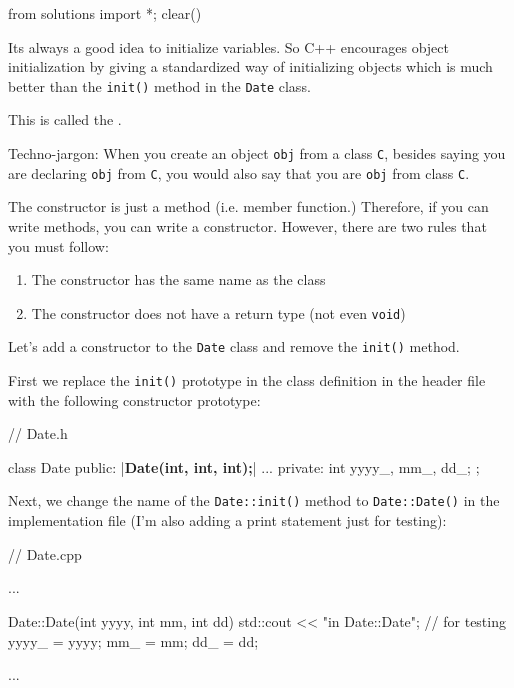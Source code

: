 \begin{python0}
from solutions import *; clear()
\end{python0}

Its always a good idea to initialize variables. So C++ encourages
object initialization by giving a standardized way of initializing
objects which is much better than the \texttt{init()} method in the
\texttt{Date} class.

This is called the .

Techno-jargon: When you create an object \texttt{obj} from a class
\texttt{C}, besides saying you are declaring \texttt{obj} from \texttt{C}, you
would also say that you are  \texttt{obj} from class
\texttt{C}.

The constructor is just a method (i.e. member function.) Therefore, if
you can write methods, you can write a constructor. However, there are
two rules that you must follow:

\begin{enumerate}
\item The constructor has the same name as the class
\item The constructor does not have a return type (not even \texttt{void})
\end{enumerate}

Let's add a constructor to the \texttt{Date} class and remove the
\texttt{init()} method.

First we replace the \texttt{init()} prototype in the class definition in
the header file with the following constructor prototype:

\begin{consolethree}[escapeinside=||]
// Date.h

class Date
{
public:
    |\textbf{Date(int, int, int);}|
    ...
private:
    int yyyy_, mm_, dd_;
};
\end{consolethree}

Next, we change the name of the \texttt{Date::init()} method to
\texttt{Date::Date()} in the implementation file (I'm also adding a print
statement just for testing):

\begin{consolethree}[escapeinside=||]
// Date.cpp

...

Date::Date(int yyyy, int mm, int dd)
{
    std::cout << "in Date::Date\n"; // for testing
    yyyy_ = yyyy;
    mm_ = mm;
    dd_ = dd;
}

...
\end{consolethree}

